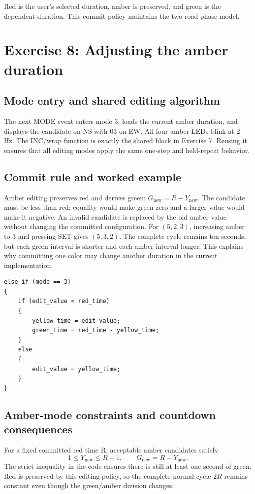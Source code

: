 \documentclass[a4paper]{article}
\newcommand{\topic}[1]{\subsection{#1}}
\begin{document}
Red is the user's selected duration, amber is preserved, and green is the
dependent duration. This commit policy maintains the two-road phase model.


\clearpage
\section{Exercise 8: Adjusting the amber duration}

\topic{Mode entry and shared editing algorithm}
The next MODE event enters mode 3, loads the current amber duration, and
displays the candidate on NS with 03 on EW. All four amber LEDs blink at 2 Hz.
The INC/wrap function is exactly the shared block in Exercise 7. Reusing it
ensures that all editing modes apply the same one-step and held-repeat behavior.

\topic{Commit rule and worked example}
Amber editing preserves red and derives green:
\(G_{\mathrm{new}}=R-Y_{\mathrm{new}}\).
The candidate must be less than red; equality would make green zero and a
larger value would make it negative. An invalid candidate is replaced by the
old amber value without changing the committed configuration.
For \((5,2,3)\), increasing amber to 3 and pressing SET gives \((5,3,2)\).
The complete cycle remains ten seconds, but each green interval is shorter
and each amber interval longer. This explains why committing one color may
change another duration in the current implementation.

\par\noindent\begin{minipage}{\linewidth}
\begin{lstlisting}[caption={SET action for mode 3}]
else if (mode == 3)
{
    if (edit_value < red_time)
    {
        yellow_time = edit_value;
        green_time = red_time - yellow_time;
    }
    else
    {
        edit_value = yellow_time;
    }
}
\end{lstlisting}
\end{minipage}\par

\topic{Amber-mode constraints and countdown consequences}

For a fixed committed red time R, acceptable amber candidates satisfy
\[
1\le Y_{\mathrm{new}}\le R-1,\qquad
G_{\mathrm{new}}=R-Y_{\mathrm{new}}.
\]
The strict inequality in the code ensures there is still at least one second
of green. Red is preserved by this editing policy, so the complete normal
cycle \(2R\) remains constant even though the green/amber division changes.
\end{document}
